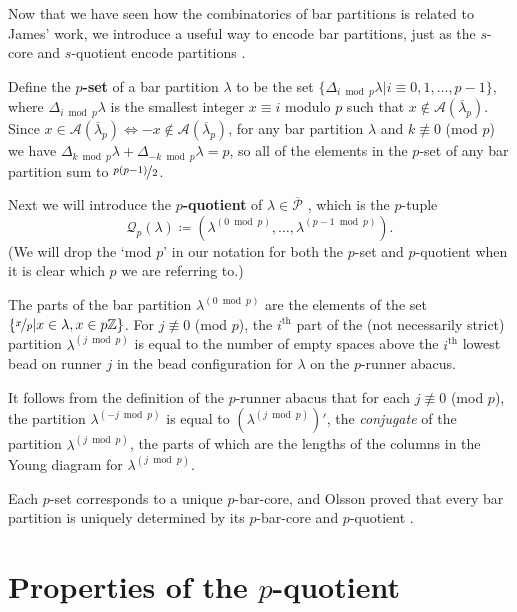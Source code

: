 \documentclass[10pt]{amsart}
\begin{document}
Now that we have seen how the combinatorics of bar partitions is related to James' work, we introduce a useful way to encode bar partitions, just as the $s$-core and $s$-quotient encode partitions \cite{JK}.

Define the $p$\textbf{-set} \cite{F3} of a bar partition $\lambda$ to be the set $\{\Delta_{i\bmod p}\lambda|i\equiv0,1,\dots,p-1\}$, where $\Delta_{i\bmod p}\lambda$ is the smallest integer $x\equiv i$ modulo $p$ such that $x\not\in\mathcal{A}(\overline{\lambda}_p)$. 
Since $x\in\mathcal{A}(\overline{\lambda}_p)\Leftrightarrow-x\not\in\mathcal{A}(\overline{\lambda}_p)$, for any bar partition $\lambda$ and $k\not\equiv0$ (mod $p$) we have $\Delta_{k\bmod p}\lambda+\Delta_{-k\bmod p}\lambda=p$, so all of the elements in the $p$-set of any bar partition sum to $\nicefrac{p(p-1)}{2}$. 

Next we will introduce the $p$\textbf{-quotient} of $\lambda\in\overline{\mathcal{P}}$ \cite{O1}, which is the $p$-tuple 
$$\mathcal{Q}_p(\lambda)\coloneqq(\lambda^{(0\bmod p)},\dots,\lambda^{(p-1\bmod p)}).$$  
(We will drop the `mod $p$' in our notation for both the $p$-set and $p$-quotient when it is clear which $p$ we are referring to.) 

The parts of the bar partition $\lambda^{(0\bmod p)}$ are the elements of the set $\{\nicefrac{x}{p}|x\in\lambda,x\in p\mathbb{Z}\}$. 
\newline
For $j\not\equiv0$ (mod $p$), the $i^\text{th}$ part of the (not necessarily strict) partition $\lambda^{(j\bmod p)}$ is equal to the number of empty spaces above the $i^\text{th}$ lowest bead on runner $j$ in the bead configuration for $\lambda$ on the $p$-runner abacus. 

It follows from the definition of the $p$-runner abacus that for each $j\not\equiv0$ (mod $p$), the partition $\lambda^{(-j\bmod p)}$ is equal to $(\lambda^{(j\bmod p)})'$, the \textit{conjugate} of the partition $\lambda^{(j\bmod p)}$, the parts of which are the lengths of the columns in the Young diagram for $\lambda^{(j\bmod p)}$. 

Each $p$-set corresponds to a unique $p$-bar-core, and Olsson proved that every bar partition is uniquely determined by its $p$-bar-core and $p$-quotient \cite[Proposition 2.2]{O1}. 


\section{Properties of the $p$-quotient}
 
\end{document}
